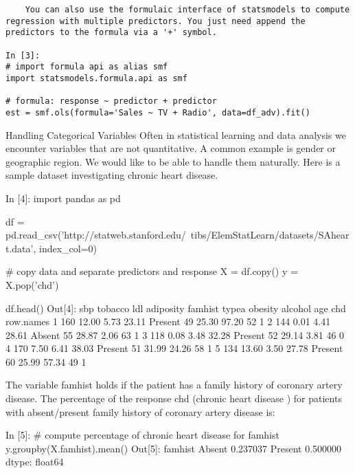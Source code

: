 \begin{frame}[fragile]
\Large
\begin{framed}
\begin{verbatim}
	You can also use the formulaic interface of statsmodels to compute regression with multiple predictors. You just need append the predictors to the formula via a '+' symbol.

In [3]:
# import formula api as alias smf
import statsmodels.formula.api as smf

# formula: response ~ predictor + predictor
est = smf.ols(formula='Sales ~ TV + Radio', data=df_adv).fit()
\end{verbatim}
\end{framed}
\end{frame}

\begin{frame}[fragile]
	\Large
	Handling Categorical Variables
Often in statistical learning and data analysis we encounter variables that are not quantitative. A common example is gender or geographic region. We would like to be able to handle them naturally. Here is a sample dataset investigating chronic heart disease.
\end{frame}

\begin{frame}[fragile]
	\Large
In [4]:
import pandas as pd

df = pd.read_csv('http://statweb.stanford.edu/~tibs/ElemStatLearn/datasets/SAheart.data', index_col=0)

# copy data and separate predictors and response
X = df.copy()
y = X.pop('chd')
\end{frame}

\begin{frame}[fragile]
	\Large
df.head()
Out[4]:
sbp	tobacco	ldl	adiposity	famhist	typea	obesity	alcohol	age	chd
row.names										
1	160	12.00	5.73	23.11	Present	49	25.30	97.20	52	1
2	144	0.01	4.41	28.61	Absent	55	28.87	2.06	63	1
3	118	0.08	3.48	32.28	Present	52	29.14	3.81	46	0
4	170	7.50	6.41	38.03	Present	51	31.99	24.26	58	1
5	134	13.60	3.50	27.78	Present	60	25.99	57.34	49	1
\end{frame}

\begin{frame}[fragile]
	\Large
	The variable famhist holds if the patient has a family history of coronary artery disease. The percentage of the response chd (chronic heart disease ) for patients with absent/present family history of coronary artery disease is:

In [5]:
# compute percentage of chronic heart disease for famhist
y.groupby(X.famhist).mean()
Out[5]:
famhist
Absent     0.237037
Present    0.500000
dtype: float64
\end{frame}

